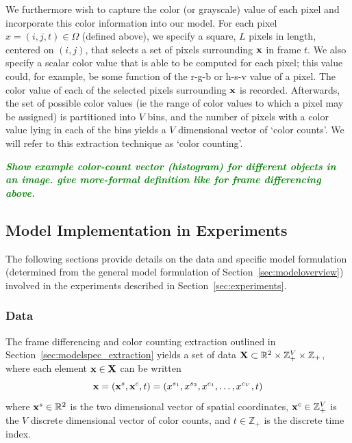 \documentclass[smallcondensed, final]{svjour3}
\newcommand{\willie}[1]{\textcolor{green}{\textsf{\emph{\textbf{\textcolor{green}{#1}}}}}}
\begin{document}
We furthermore wish to capture the color (or grayscale) value of each pixel and incorporate this color information into our model. For each pixel $x = (i, j, t) \in \Omega$ (defined above), we specify a square, $L$ pixels in length, centered on $(i, j)$, that selects a set of pixels surrounding $\bold{x}$ in frame $t$. We also specify a scalar color value that is able to be computed for each pixel; this value could, for example, be some function of the r-g-b or h-s-v value of a pixel. The color value of each of the selected pixels surrounding $\bold{x}$ is recorded. Afterwards, the set of possible color values (ie the range of color values to which a pixel may be assigned) is partitioned into $V$ bins, and the number of pixels with a color value lying in each of the bins yields a $V$ dimensional vector of `color counts'. We will refer to this extraction technique as `color counting'.

\willie{Show example color-count vector (histogram) for different objects in an image. give more-formal definition like for frame differencing above.}







\subsection{Model Implementation in Experiments}

The following sections provide details on the data and specific model formulation (determined from the general model formulation of Section~\ref{sec:modeloverview}) involved in the experiments described in Section~\ref{sec:experiments}.


\subsubsection{Data}

The frame differencing and color counting extraction outlined in Section~\ref{sec:modelspec_extraction} yields a set of data $\bold{X} \subset \mathbb{R}^{2} \times \mathbb{Z}_{+}^{V} \times \mathbb{Z}_{+}$, where each element $\bold{x} \in \bold{X}$ can be written
\begin{equation}
\bold{x} = ( \bold{x}^{s}, \bold{x}^{c}, t ) = ( x^{s_{1}}, x^{s_{2}}, x^{c_{1}}, \ldots, x^{c_{V}}, t )
\end{equation}
where $\bold{x}^{s} \in \mathbb{R}^{2}$ is the two dimensional vector of spatial coordinates,  $\bold{x}^{c} \in \mathbb{Z}_{+}^{V}$ is the $V$ discrete dimensional vector of color counts, and $t \in \mathbb{Z}_{+}$ is the discrete time index. 
\end{document}
